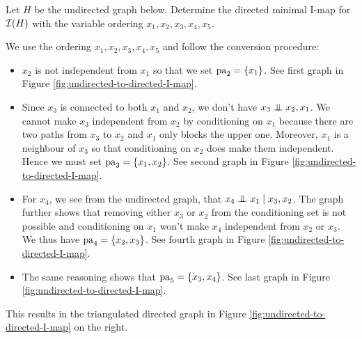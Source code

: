 \begin{exenumerate}
\item Let $H$ be the undirected graph below. Determine the directed
  minimal I-map for $\mathcal{I}(H)$ with the variable ordering $x_1, x_2,
  x_3, x_4, x_5$.
  \label{q:undirected-to-directed-I-map}
  \begin{center}
  \end{center}

  \begin{solution}
    We use the ordering $x_1, x_2, x_3, x_4, x_5$ and follow the
    conversion procedure:
    
    \begin{itemize}
      \item $x_2$ is not independent from $x_1$ so that we set $\mathrm{pa}_2 =\{x_1\}$. See first graph in Figure \ref{fig:undirected-to-directed-I-map}.
      \item Since $x_3$ is connected to both $x_1$ and $x_2$, we
        don't have $x_3 \mathrel{\perp\mspace{-10mu}\perp} x_2, x_1$. We cannot
        make $x_3$ independent from $x_2$ by conditioning on $x_1$
        because there are two paths from $x_3$ to $x_2$ and $x_1$ only
        blocks the upper one. Moreover, $x_1$ is a neighbour of $x_3$
        so that conditioning on $x_2$ does make them
        independent. Hence we must set $\mathrm{pa}_3 = \{x_1, x_2\}$.  See
        second graph in Figure \ref{fig:undirected-to-directed-I-map}.
      \item For $x_4$, we see from the undirected graph, that $x_4
        \mathrel{\perp\mspace{-10mu}\perp} x_1 \mid x_3, x_2$. The graph further shows that
        removing either $x_3$ or $x_2$ from the conditioning set is
        not possible and conditioning on $x_1$ won't make $x_4$
        independent from $x_2$ or $x_3$. We thus have $\mathrm{pa}_4 = \{x_2,
        x_3\}$.  See fourth graph in Figure \ref{fig:undirected-to-directed-I-map}.
      \item The same reasoning shows that $\mathrm{pa}_5 = \{x_3,x_4\}$. See last graph in Figure \ref{fig:undirected-to-directed-I-map}.
    \end{itemize}
    This results in the triangulated directed graph in Figure
    \ref{fig:undirected-to-directed-I-map} on the right.
 

\end{solution}
\end{exenumerate}
